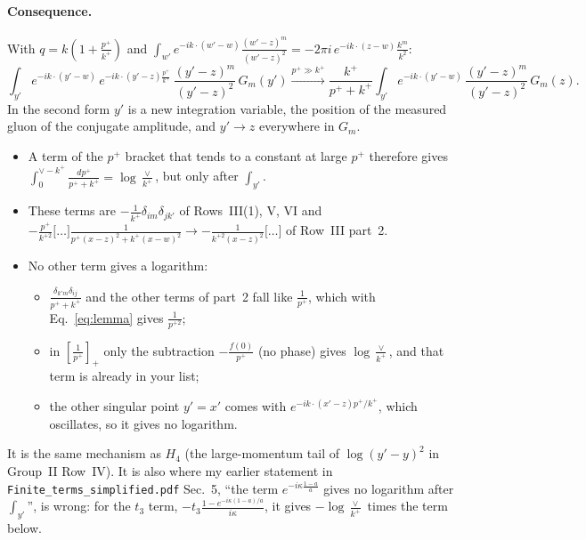 \documentclass[10pt]{article}
\numberwithin{equation}{section}
\begin{document}
\paragraph{Consequence.} With $q=k(1+\frac{p^+}{k^+})$ and $\int_{w'}e^{-ik\cdot(w'-w)}\frac{(w'-z)^m}{(w'-z)^2}=-2\pi i\,e^{-ik\cdot(z-w)}\frac{k^m}{k^2}$:
\begin{equation}
\int_{y'}e^{-ik\cdot(y'-w)}\,e^{-ik\cdot(y'-z)\frac{p^+}{k^+}}\,\frac{(y'-z)^m}{(y'-z)^2}\,G_m(y')\xrightarrow{p^+\gg k^+}\frac{k^+}{p^++k^+}\int_{y'}e^{-ik\cdot(y'-w)}\,\frac{(y'-z)^m}{(y'-z)^2}\,G_m(z).
\label{eq:lemma}
\end{equation}
In the second form $y'$ is a new integration variable, the position of the measured gluon of the conjugate amplitude, and $y'\to z$ everywhere in $G_m$.
\begin{itemize}
\item A term of the $p^+$ bracket that tends to a constant at large $p^+$ therefore gives $\int_0^{\vee-k^+}\frac{dp^+}{p^++k^+}=\log\frac{\vee}{k^+}$, but only after $\int_{y'}$.
\item These terms are $-\frac{1}{k^+}\delta_{im}\delta_{jk'}$ of Rows~III(1), V, VI and $-\frac{p^+}{k^{+2}}\big[\dots\big]\frac{1}{p^+(x-z)^2+k^+(x-w)^2}\to-\frac{1}{k^{+2}(x-z)^2}\big[\dots\big]$ of Row~III part~2.
\item No other term gives a logarithm:
\begin{itemize}
\item $\frac{\delta_{k'm}\delta_{ij}}{p^++k^+}$ and the other terms of part~2 fall like $\frac{1}{p^+}$, which with Eq.~\eqref{eq:lemma} gives $\frac{1}{p^{+2}}$;
\item in $[\frac{1}{p^+}]_+$ only the subtraction $-\frac{f(0)}{p^+}$ (no phase) gives $\log\frac{\vee}{k^+}$, and that term is already in your list;
\item the other singular point $y'=x'$ comes with $e^{-ik\cdot(x'-z)p^+/k^+}$, which oscillates, so it gives no logarithm.
\end{itemize}
\end{itemize}
It is the same mechanism as $H_4$ (the large-momentum tail of $\log(y'-y)^2$ in Group~II Row~IV). It is also where my earlier statement in \texttt{Finite\_terms\_simplified.pdf} Sec.~5, ``the term $e^{-i\kappa\frac{1-a}{a}}$ gives no logarithm after $\int_{y'}$'', is wrong: for the $t_3$ term, $-t_3\frac{1-e^{-i\kappa(1-a)/a}}{i\kappa}$, it gives $-\log\frac{\vee}{k^+}$ times the term below.
\end{document}
